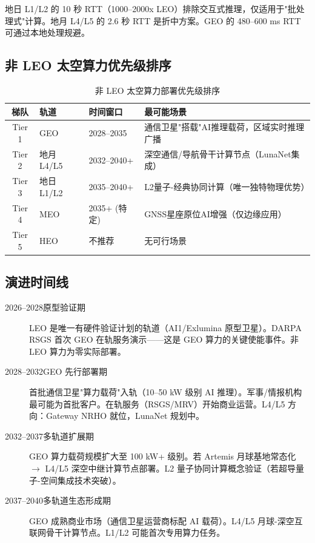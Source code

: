 地日 L1/L2 的 10 秒 RTT（1000--2000x LEO）排除交互式推理，仅适用于"批处理式"计算。地月 L4/L5 的 2.6 秒 RTT 是折中方案。GEO 的 480--600 ms RTT 可通过本地处理规避。

\subsection{非 LEO 太空算力优先级排序}

\newcommand{\stars}[1]{\textbf{\textcolor{accent}{#1}}}

\begin{table}[H]
\centering
\caption{非 LEO 太空算力部署优先级排序}
\label{tab:priority}
\small
\begin{tabular}{@{}cllp{5.5cm}@{}}
\toprule
\textbf{梯队} & \textbf{轨道} & \textbf{时间窗口} & \textbf{最可能场景} \\
\midrule
Tier 1 & GEO        & 2028--2035   & 通信卫星"搭载"AI推理载荷，区域实时推理广播 \\
Tier 2 & 地月 L4/L5 & 2032--2040+  & 深空通信/导航骨干计算节点（LunaNet集成）\\
Tier 3 & 地日 L1/L2 & 2035--2040+  & L2量子-经典协同计算（唯一独特物理优势）\\
Tier 4 & MEO        & 2035+ (特定) & GNSS星座原位AI增强（仅边缘应用）\\
Tier 5 & HEO        & 不推荐       & 无可行场景 \\
\bottomrule
\end{tabular}
\end{table}

\subsection{演进时间线}

\begin{description}
    \item[2026--2028\quad 原型验证期] LEO 是唯一有硬件验证计划的轨道（AI1/Exlumina 原型卫星）。DARPA RSGS 首次 GEO 在轨服务演示——这是 GEO 算力的关键使能事件。非 LEO 算力为零实际部署。
    \item[2028--2032\quad GEO 先行部署期] 首批通信卫星"算力载荷"入轨（10--50 kW 级别 AI 推理）。军事/情报机构最可能为首批客户。在轨服务（RSGS/MRV）开始商业运营。L4/L5 方向：Gateway NRHO 就位，LunaNet 规划中。
    \item[2032--2037\quad 多轨道扩展期] GEO 算力载荷规模扩大至 100 kW+ 级别。若 Artemis 月球基地常态化 $\rightarrow$ L4/L5 深空中继计算节点部署。L2 量子协同计算概念验证（若超导量子-空间集成技术突破）。
    \item[2037--2040\quad 多轨道生态形成期] GEO 成熟商业市场（通信卫星运营商标配 AI 载荷）。L4/L5 月球-深空互联网骨干计算节点。L1/L2 可能首次专用算力任务。
\end{description}

